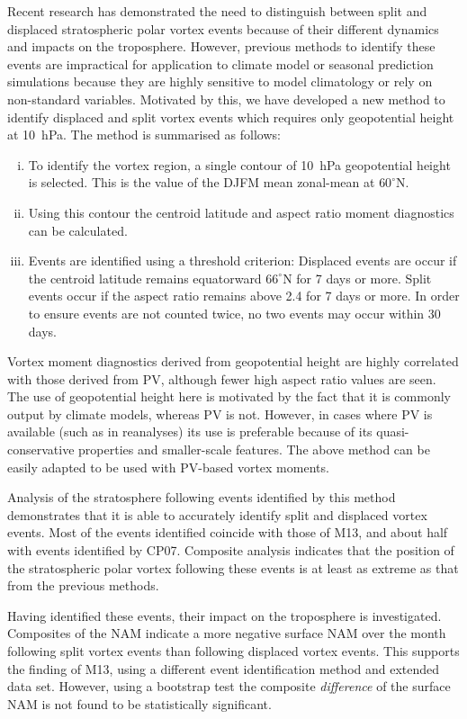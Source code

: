 Recent research has demonstrated the need to distinguish between split and
displaced stratospheric polar vortex events because of their different dynamics
and impacts on the troposphere. However, previous methods to identify these
events are impractical for application to climate model or seasonal prediction
simulations because they are highly sensitive to model climatology or rely on
non-standard variables. Motivated by this, we have developed a new method to
identify displaced and split vortex events which requires only geopotential
height at 10~hPa. The method is summarised as follows:
\begin{enumerate}[i.]
\item To identify the vortex region, a single contour of 10~hPa geopotential
  height is selected. This is the value of the DJFM mean zonal-mean at
  $60^{\circ}$N.
\item Using this contour the centroid latitude and aspect ratio moment
  diagnostics can be calculated.
\item Events are identified using a threshold criterion: Displaced events are
  occur if the centroid latitude remains equatorward $66^{\circ}$N for 7
  days or more. Split events occur if the aspect ratio remains above
  2.4 for 7 days or more. In order to ensure events are not counted twice, no
  two events may occur within 30 days.
\end{enumerate}
Vortex moment diagnostics derived from geopotential height are highly correlated
with those derived from PV, although fewer high aspect ratio values are
seen. The use of geopotential height here is motivated by the fact that it is
commonly output by climate models, whereas PV is not. However, in cases where PV
is available (such as in reanalyses) its use is preferable because of its
quasi-conservative properties and smaller-scale features. The above method can
be easily adapted to be used with PV-based vortex moments.

Analysis of the stratosphere following events identified by this method
demonstrates that it is able to accurately identify split and displaced vortex
events. Most of the events identified coincide with those of M13, and about
half with events identified by CP07. Composite analysis indicates that the
position of the stratospheric polar vortex following these events is at least as
extreme as that from the previous methods. 

Having identified these events, their impact on the troposphere is
investigated. Composites of the NAM indicate a more negative surface NAM over
the month following split vortex events than following displaced vortex
events. This supports the finding of M13, using a different event identification
method and extended data set. However, using a bootstrap test the composite
\emph{difference} of the surface NAM is not found to be statistically
significant.

